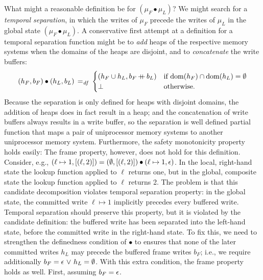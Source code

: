 \documentclass[11pt]{report}
\begin{document}
What might a reasonable definition be for $(\mu_F \bullet \mu_L)$? We might search for a \emph{temporal separation}, in which the writes of $\mu_F$ precede the writes of $\mu_L$ in the global state $(\mu_F \bullet \mu_L)$. A conservative first attempt at a definition for a temporal separation function might be to \emph{add} heaps of the respective memory systems when the domains of the heaps are disjoint, and to \emph{concatenate} the write buffers: \[ (h_F,b_F) \bullet (h_L,b_L) \operatorname{\;=_{\mathit{df}}\;} \begin{cases}
    (h_F \cup h_L, b_F \operatorname{+\!\!\!+} b_L) & \text{if $\operatorname{\mathrm{dom}}(h_F) \cap \operatorname{\mathrm{dom}}(h_L) = \operatorname{\emptyset}$} \\ 
    \bot & \text{otherwise.}
\end{cases}\] Because the separation is only defined for heaps with disjoint domains, the addition of heaps does in fact result in a heap; and the concatenation of write buffers always results in a write buffer, so the separation is well defined partial function that maps a pair of uniprocessor memory systems to another uniprocessor memory system. Furthermore, the safety monotonicity property holds easily: 
The frame property, however, does not hold for this definition. Consider, e.g., $(\ell \mapsto 1, \left[(\ell,2)\right]) = (\operatorname{\emptyset}, \left[(\ell,2)\right]) \bullet (\ell \mapsto 1, \epsilon)$. In the local, right-hand state the lookup function applied to $\ell$ returns one, but in the global, composite state the lookup function applied to $\ell$ returns 2. The problem is that this candidate decomposition violates temporal separation property: in the global state, the committed write $\ell \mapsto 1$ implicitly precedes every buffered write. Temporal separation should preserve this property, but it is violated by the candidate definition: the buffered write has been separated into the left-hand state, before the committed write in the right-hand state. To fix this, we need to strengthen the definedness condition of $\bullet$ to ensures that none of the later committed writes $h_L$ may precede the buffered frame writes $b_F$; i.e., we require additionally $b_F = \epsilon \operatorname{\,\vee\,} h_L = \operatorname{\emptyset}$. With this extra condition, the frame property holds as well. First, assuming $b_F = \epsilon$. 
\end{document}
